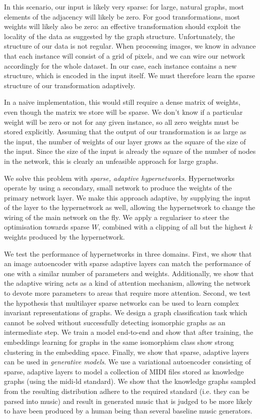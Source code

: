 \documentclass[11pt]{article}
\begin{document}
In this scenario, our input is likely very sparse: for large, natural graphs, most elements of the adjacency will likely be zero. For good transformations, most weights will likely also be zero: an effective transformation should exploit the locality of the data as suggested by the graph structure. Unfortunately, the structure of our data is not regular. When processing images, we know in advance that each instance will consist of a grid of pixels, and we can wire our network accordingly for the whole dataset. In our case, each instance contains a new structure, which is encoded in the input itself. We must therefore learn the sparse structure of our transformation adaptively.

In a naive implementation, this would still require a dense matrix of weights, even though the matrix we store will be sparse. We don't know if a particular weight will be zero or not for any given instance, so all zero weights must be stored explicitly. Assuming that the output of our transformation is as large as the input, the number of weights of our layer grows as the square of the size of the input. Since the size of the input is already the square of the number of nodes in the network, this is clearly an unfeasible approach for large graphs.

We solve this problem with \emph{sparse, adaptive hypernetworks}. Hypernetworks \cite{ha2016hypernetworks} operate by using a secondary, small network to produce the weights of  the primary network layer. We make this approach adaptive, by supplying the input of the layer to the hypernetwork as well, allowing the hypernetwork to change the wiring of the main network on the fly. We apply a regulariser to steer the optimisation towards sparse $W$, combined with a clipping of all but the highest $k$ weights produced by the hypernetwork.

We test the performance of hypernetworks in three domains. First, we show that an image autoencoder with sparse adaptive layers can match the performance of one with a similar number of parameters and weights. Additionally, we show that the adaptive wiring acts as a kind of attention mechanism, allowing the network to devote more parameters to areas that require more attention. Second, we test the hypothesis that multilayer sparse networks can be used to learn complex invariant representations of graphs. We design a graph classification task which cannot be solved without successfully detecting isomorphic graphs as an intermediate step. We train a model end-to-end and show that after training, the embeddings learning for graphs in the same isomorphism class show strong clustering in the embedding space. Finally, we show that sparse, adaptive layers can be used in \emph{generative models}. We use a variational autoencoder \cite{kingma2013auto} consisting of sparse, adaptive layers to model a collection of MIDI files stored as knowledge graphs (using the midi-ld standard). We show that the knowledge graphs sampled from the resulting distribution adhere to the required standard (i.e. they can be parsed into music) and result in generated music that is judged to be more likely to have been produced by a human being than several baseline music generators.
\end{document}
